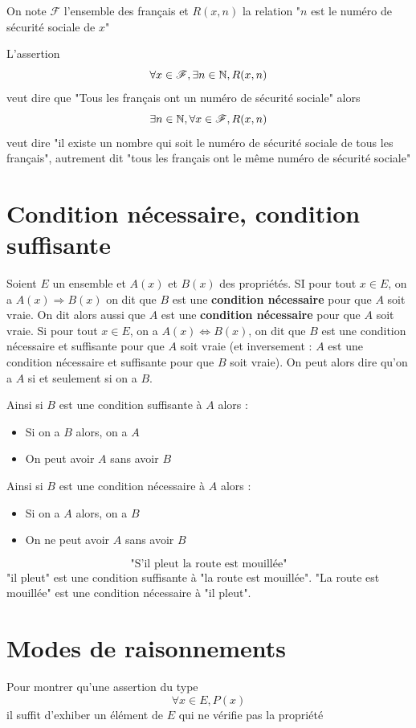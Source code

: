 \begin{exemple}
On note $\mathscr{F}$ l'ensemble des français et $R(x,n)$ la relation "$n$ est le numéro de sécurité sociale de $x$"\newline

L'assertion 
$$\forall x \in \mathscr{F}, \exists n \in \mathbb{N}, R(x,n)$$
veut dire que "Tous les français ont un numéro de sécurité sociale"
alors 
$$\exists n \in \mathbb{N}, \forall x \in \mathscr{F}, R(x,n)$$
veut dire "il existe un nombre qui soit le numéro de sécurité sociale de tous les français", autrement dit "tous les français ont le même numéro de sécurité sociale"
\end{exemple}
\section{Condition nécessaire, condition suffisante}
Soient $E$ un ensemble et $A(x)$ et $B(x)$ des propriétés. SI pour tout $x\in E$, on a $A(x) \Rightarrow B(x)$ on dit que $B$ est une \textbf{condition nécessaire} pour que $A$ soit vraie. On dit alors aussi que $A$ est une \textbf{condition nécessaire} pour que $A$ soit vraie. Si pour tout $x\in E$, on a $A(x) \Leftrightarrow B(x)$, on dit que $B$ est une condition nécessaire et suffisante pour que $A$ soit vraie (et inversement : $A$ est une condition nécessaire et suffisante pour que $B$ soit vraie). On peut alors dire qu'on a $A$ si et seulement si on a $B$.\newline

Ainsi si $B$ est une condition suffisante à $A$ alors : \begin{itemize}\item Si on a $B$ alors, on a $A$ \item On peut avoir $A$ sans avoir $B$ \end{itemize}
Ainsi si $B$ est une condition nécessaire à $A$ alors : \begin{itemize}\item Si on a $A$ alors, on a $B$ \item On ne peut avoir $A$ sans avoir $B$ \end{itemize}
\begin{exemple}
$$\text{"S'il pleut la route est mouillée"}$$
"il pleut" est une condition suffisante à "la route est mouillée". "La route est mouillée" est une condition nécessaire à "il pleut".
\end{exemple}
\section{Modes de raisonnements}
Pour montrer qu'une assertion du type 
$$\forall x \in E , P(x)$$ il suffit d'exhiber un élément de $E$ qui ne vérifie pas la propriété\newline


